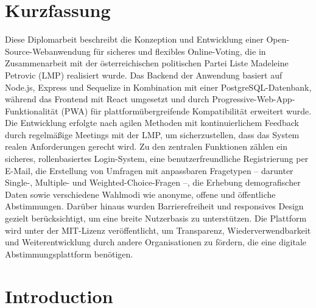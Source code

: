 \documentclass[a4paper,12pt]{report}
\begin{document}
\chapter*{Kurzfassung}
Diese Diplomarbeit beschreibt die Konzeption und Entwicklung einer Open-Source-Webanwendung für sicheres und flexibles Online-Voting, die in Zusammenarbeit mit der österreichischen politischen Partei Liste Madeleine Petrovic (LMP) realisiert wurde. Das Backend der Anwendung basiert auf Node.js, Express und Sequelize in Kombination mit einer PostgreSQL-Datenbank, während das Frontend mit React umgesetzt und durch Progressive-Web-App-Funktionalität (PWA) für plattformübergreifende Kompatibilität erweitert wurde. Die Entwicklung erfolgte nach agilen Methoden mit kontinuierlichem Feedback durch regelmäßige Meetings mit der LMP, um sicherzustellen, dass das System realen Anforderungen gerecht wird. Zu den zentralen Funktionen zählen ein sicheres, rollenbasiertes Login-System, eine benutzerfreundliche Registrierung per E-Mail, die Erstellung von Umfragen mit anpassbaren Fragetypen – darunter Single-, Multiple- und Weighted-Choice-Fragen –, die Erhebung demografischer Daten sowie verschiedene Wahlmodi wie anonyme, offene und öffentliche Abstimmungen. Darüber hinaus wurden Barrierefreiheit und responsives Design gezielt berücksichtigt, um eine breite Nutzerbasis zu unterstützen. Die Plattform wird unter der MIT-Lizenz veröffentlicht, um Transparenz, Wiederverwendbarkeit und Weiterentwicklung durch andere Organisationen zu fördern, die eine digitale Abstimmungsplattform benötigen.
\newpage

\tableofcontents
\newpage

\chapter{Introduction}
\end{document}
